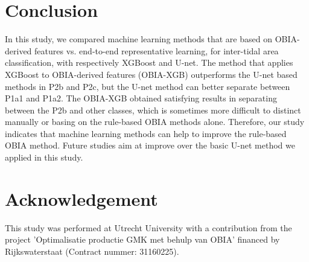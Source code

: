 \documentclass{isprs} %
\begin{document}
\section{Conclusion}

In this study, we compared machine learning methods that are based on OBIA-derived features vs. end-to-end representative learning, for inter-tidal area classification, with respectively XGBoost and U-net. The method that applies XGBoost to OBIA-derived features (OBIA-XGB) outperforms the U-net based methods in P2b and P2c, but the U-net method can better separate between P1a1 and P1a2. The OBIA-XGB obtained satisfying results in separating between the P2b and other classes, which is sometimes more difficult to distinct manually or basing on the rule-based OBIA methods alone. Therefore, our study indicates that machine learning methods can help to improve the rule-based OBIA method. Future studies aim at improve over the basic U-net method we applied in this study. 



\section{Acknowledgement}

This study was performed at Utrecht University with a contribution from the project 'Optimalisatie productie GMK met behulp van OBIA' financed by Rijkswaterstaat (Contract nummer: 31160225). 


%

\end{document}

